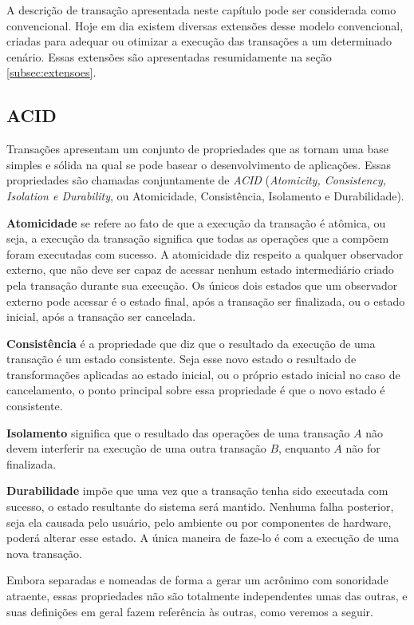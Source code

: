 \documentclass[11pt,twoside,a4paper]{book}
\begin{document}
A descrição de transação apresentada neste capítulo pode ser considerada como convencional. Hoje em dia existem diversas extensões desse modelo convencional, criadas para adequar ou otimizar a execução das transações a um determinado cenário. Essas extensões são apresentadas resumidamente na seção \ref{subsec:extensoes}.

\subsection{ACID}
\label{subsec:acid}
Transações apresentam um conjunto de propriedades que as tornam uma base simples e sólida na qual se pode basear o desenvolvimento de aplicações. Essas propriedades são chamadas conjuntamente de \emph{ACID} (\emph{Atomicity, Consistency, Isolation e Durability}, ou Atomicidade, Consistência, Isolamento e Durabilidade). 

\textbf{Atomicidade} se refere ao fato de que a execução da transação é atômica, ou seja, a execução da transação significa que todas as operações que a compõem foram executadas com sucesso. A atomicidade diz respeito a qualquer observador externo, que não deve ser capaz de acessar nenhum estado intermediário criado pela transação durante sua execução. Os únicos dois estados que um observador externo pode acessar é o estado final, após a transação ser finalizada, ou o estado inicial, após a transação ser cancelada.

\textbf{Consistência} é a propriedade que diz que o resultado da execução de uma transação é um estado consistente. Seja esse novo estado o resultado de transformações aplicadas ao estado inicial, ou o próprio estado inicial no caso de cancelamento, o ponto principal sobre essa propriedade é que o novo estado é consistente.

\textbf{Isolamento} significa que o resultado das operações de uma transação $A$ não devem interferir na execução de uma outra transação $B$, enquanto $A$ não for finalizada.

\textbf{Durabilidade} impõe que uma vez que a transação tenha sido executada com sucesso, o estado resultante do sistema será mantido. Nenhuma falha posterior, seja ela causada pelo usuário, pelo ambiente ou por componentes de hardware, poderá alterar esse estado. A única maneira de faze-lo é com a execução de uma nova transação.

Embora separadas e nomeadas de forma a gerar um acrônimo com sonoridade atraente, essas propriedades não são totalmente independentes umas das outras, e suas definições em geral fazem referência às outras, como veremos a seguir.
\end{document}
